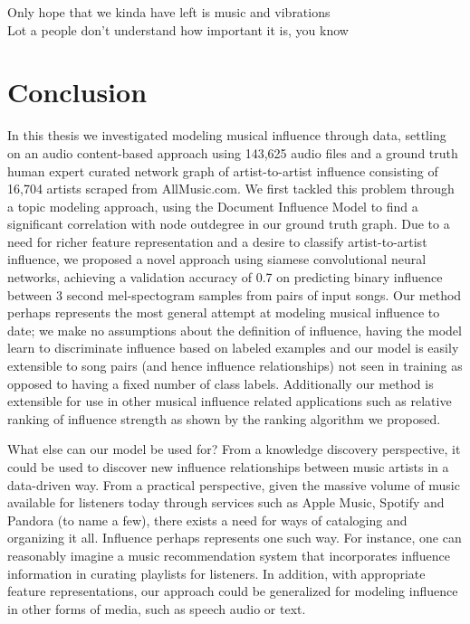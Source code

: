 \begin{savequote}[75mm] 
Only hope that we kinda have left is music and vibrations\\
Lot a people don’t understand how important it is, you know
\end{savequote}

\chapter{Conclusion}

In this thesis we investigated modeling musical influence through data, settling on an audio content-based approach using 143,625 audio files and a ground truth human expert curated network graph of artist-to-artist influence consisting of 16,704 artists scraped from AllMusic.com. We first tackled this problem through a topic modeling approach, using the Document Influence Model to find a significant correlation with node outdegree in our ground truth graph. Due to a need for richer feature representation and a desire to classify artist-to-artist influence, we proposed a novel approach using siamese convolutional neural networks, achieving a validation accuracy of 0.7 on predicting binary influence between 3 second mel-spectogram samples from pairs of input songs. Our method perhaps represents the most general attempt at modeling musical influence to date; we make no assumptions about the definition of influence, having the model learn to discriminate influence based on labeled examples and our model is easily extensible to song pairs (and hence influence relationships) not seen in training as opposed to having a fixed number of class labels. Additionally our method is extensible for use in other musical influence related applications such as relative ranking of influence strength as shown by the ranking algorithm we proposed.

What else can our model be used for? From a knowledge discovery perspective, it could be used to discover new influence relationships between music artists in a data-driven way. From a practical perspective, given the massive volume of music available for listeners today through services such as Apple Music, Spotify and Pandora (to name a few), there exists a need for ways of cataloging and organizing it all. Influence perhaps represents one such way. For instance, one can reasonably imagine a music recommendation system that incorporates influence information in curating playlists for listeners. In addition, with appropriate feature representations, our approach could be generalized for modeling influence in other forms of media, such as speech audio or text.

